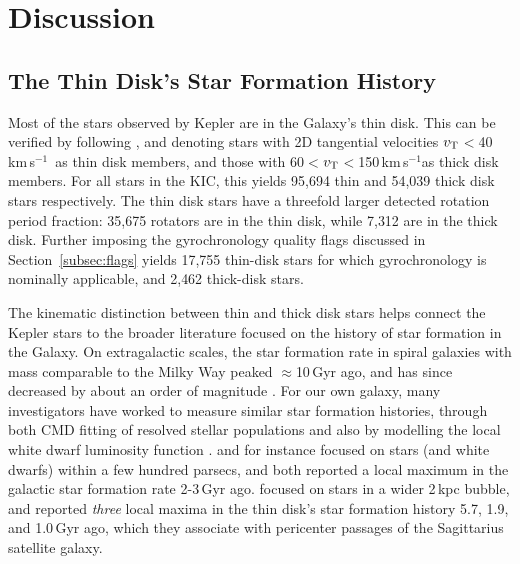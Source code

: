 \documentclass[11pt,twocolumn,tighten]{aastex63}
\newcommand{\kms}{{km\,s$^{-1}$}}
\begin{document}



\section{Discussion}
\label{sec:disc}

\subsection{The Thin Disk's Star Formation History}

Most of the stars observed by Kepler are in the Galaxy's thin disk.
This can be verified by following \citet{Gaia_2018}, and denoting stars with 2D tangential
velocities $v_{\rm T}$$<$40\,\kms\ as thin disk members, and those
with 60$<$$v_{\rm T}$$<$150\,\kms as thick disk members.  For all
stars in the KIC, this yields 95{,}694 thin and 54{,}039 thick disk stars respectively.  
The thin disk stars have a threefold larger detected rotation period
fraction: 35{,}675 rotators are in the thin disk, while 7{,}312 are in
the thick disk.  Further imposing the gyrochronology quality flags
discussed in Section~\ref{subsec:flags} yields 17{,}755
thin-disk stars for which gyrochronology is nominally applicable, and
2{,}462 thick-disk stars.

The kinematic distinction between thin and thick disk stars helps connect
the Kepler stars to the broader literature focused
on the history of star formation in the Galaxy.  On extragalactic
scales, the star formation rate in spiral galaxies with mass
comparable to the Milky Way peaked $\approx$10\,Gyr ago, and has since
decreased by about an order of magnitude
\citep[e.g.][]{2004Natur.428..625H,2006ApJ...651..142H}.  For our own
galaxy, many investigators have worked to measure similar star
formation histories, through both CMD fitting of resolved stellar
populations
\citep[][]{2019A&A...624L...1M,2020NatAs...4..965R,2021MNRAS.501..302A,2022Natur.603..599X}
and also by modelling the local white dwarf luminosity function
\citep[e.g.][]{2019ApJ...878L..11I}.  
\citet{2019A&A...624L...1M} and \citet{2019ApJ...878L..11I} for
instance focused on stars (and white dwarfs) within a few hundred
parsecs, and both reported a local maximum in the galactic star
formation rate 2-3\,Gyr ago.  \citet{2020NatAs...4..965R} focused on
stars in a wider 2\,kpc bubble, and reported {\it three} local maxima
in the thin disk's star formation history 5.7, 1.9, and 1.0\,Gyr ago,
which they associate with pericenter passages of the Sagittarius satellite
galaxy.
\end{document}
